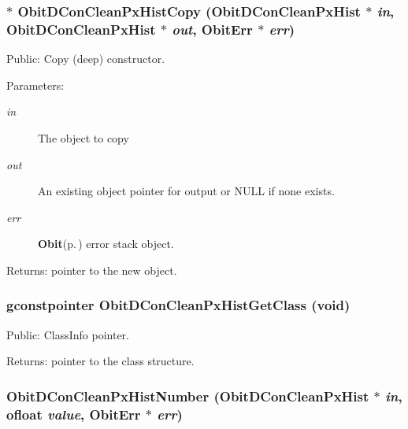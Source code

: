 \subsubsection{$\ast$ Obit\-DCon\-Clean\-Px\-Hist\-Copy ({\bf Obit\-DCon\-Clean\-Px\-Hist} $\ast$ {\em in}, {\bf Obit\-DCon\-Clean\-Px\-Hist} $\ast$ {\em out}, {\bf Obit\-Err} $\ast$ {\em err})}\label{ObitDConCleanPxHist_8h_a6}


Public: Copy (deep) constructor. 

\begin{Desc}
\item[Parameters:]
\begin{description}
\item[{\em in}]The object to copy \item[{\em out}]An existing object pointer for output or NULL if none exists. \item[{\em err}]{\bf Obit}{\rm (p.\,\pageref{structObit})} error stack object. \end{description}
\end{Desc}
\begin{Desc}
\item[Returns:]pointer to the new object. \end{Desc}
\subsubsection{\setlength{\rightskip}{0pt plus 5cm}gconstpointer Obit\-DCon\-Clean\-Px\-Hist\-Get\-Class (void)}\label{ObitDConCleanPxHist_8h_a5}


Public: Class\-Info pointer. 

\begin{Desc}
\item[Returns:]pointer to the class structure. \end{Desc}
\subsubsection{ Obit\-DCon\-Clean\-Px\-Hist\-Number ({\bf Obit\-DCon\-Clean\-Px\-Hist} $\ast$ {\em in}, {\bf ofloat} {\em value}, {\bf Obit\-Err} $\ast$ {\em err})}\label{ObitDConCleanPxHist_8h_a9}


